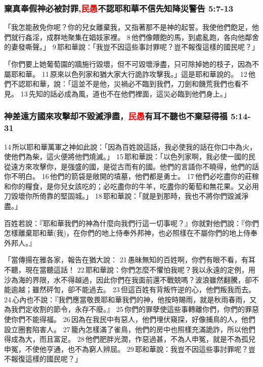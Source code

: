\subsubsection{棄真奉假神必被討罪,\textcolor{red}{民愚}不認耶和華不信先知降災警告 5:7-13}
「我怎能赦免你呢？你的兒女離棄我，又指著那不是神的起誓。我使他們飽足，他們就行姦淫，成群地聚集在娼妓家裡。 8 他們像餵飽的馬，到處亂跑，各向他鄰舍的妻發嘶聲。」 9 耶和華說：「我豈不因這些事討罪呢？豈不報復這樣的國民呢？」


「你們要上她葡萄園的牆施行毀壞，但不可毀壞淨盡，只可除掉她的枝子，因為不屬耶和華。 11 原來以色列家和猶大家大行詭詐攻擊我。」這是耶和華說的。 
12 他們不認耶和華，說：「這並不是他，災禍必不臨到我們，刀劍和饑荒我們也看不見。 13 先知的話必成為風，道也不在他們裡面，這災必臨到他們身上。」

\subsubsection{神差遠方國來攻擊却不毀滅淨盡，\textcolor{red}{民愚}有耳不聽也不棄惡得福 5:14-31}
14 所以耶和華萬軍之神如此說：「因為百姓說這話，我必使我的話在你口中為火，使他們為柴，這火便將他們燒滅。」 15 耶和華說：「以色列家啊，我必使一國的民從遠方來攻擊你，是強盛的國，是從古而有的國。他們的言語你不曉得，他們的話你不明白。 16 他們的箭袋是敞開的墳墓，他們都是勇士。 17 他們必吃盡你的莊稼和你的糧食，是你兒女該吃的；必吃盡你的牛羊，吃盡你的葡萄和無花果。又必用刀毀壞你所倚靠的堅固城。」 18 耶和華說：「就是到那時，我也不將你們毀滅淨盡。」


百姓若說：『耶和華我們的神為什麼向我們行這一切事呢？』你就對他們說：『你們怎樣離棄耶和華(我)，在你們的地上侍奉外邦神，也必照樣在不屬你們的地上侍奉外邦人。』

「當傳揚在雅各家，報告在猶大說： 21 愚昧無知的百姓啊，你們有眼不看，有耳不聽，現在當聽這話！ 22 耶和華說：你們怎麼不懼怕我呢？我以永遠的定例，用沙為海的界限，水不得越過，因此你們在我面前還不戰兢嗎？波浪雖然翻騰，卻不能逾越；雖然砰訇，卻不能過去。 23 但這百姓有背叛忤逆的心，他們叛我而去。 24 心內也不說：『我們應當敬畏耶和華我們的神，他按時賜雨，就是秋雨春雨，又為我們定收割的節令，永存不廢。』 25 你們的罪孽使這些事轉離你們，你們的罪惡使你們不能得福。 26 因為在我民中有惡人，他們埋伏窺探，好像捕鳥的人，他們設立圈套陷害人。 27 籠內怎樣滿了雀鳥，他們的房中也照樣充滿詭詐，所以他們得成為大，而且富足。 28 他們肥胖光潤，作惡過甚，不為人申冤，就是不為孤兒申冤，不使他亨通，也不為窮人辨屈。 29 耶和華說：我豈不因這些事討罪呢？豈不報復這樣的國民呢？」

